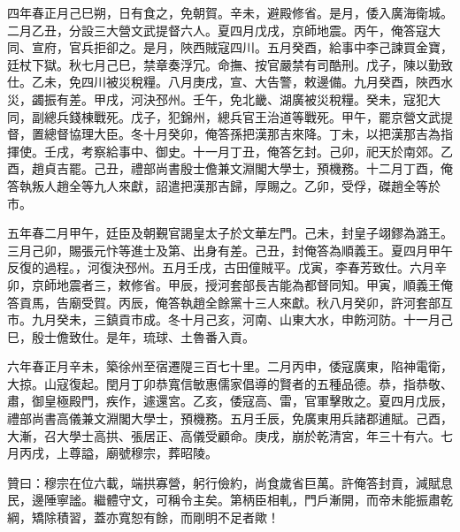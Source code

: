 \begin{pinyinscope}
四年春正月己巳朔，日有食之，免朝賀。辛未，避殿修省。是月，倭入廣海衛城。二月乙丑，分設三大營文武提督六人。夏四月戊戌，京師地震。丙午，俺答寇大同、宣府，官兵拒卻之。是月，陜西賊寇四川。五月癸酉，給事中李己諫買金寶，廷杖下獄。秋七月己巳，禁章奏浮冗。命撫、按官嚴禁有司酷刑。戊子，陳以勤致仕。乙未，免四川被災稅糧。八月庚戌，宣、大告警，敕邊備。九月癸酉，陜西水災，蠲振有差。甲戌，河決邳州。壬午，免北畿、湖廣被災稅糧。癸未，寇犯大同，副總兵錢棟戰死。戊子，犯錦州，總兵官王治道等戰死。甲午，罷京營文武提督，置總督協理大臣。冬十月癸卯，俺答孫把漢那吉來降。丁未，以把漢那吉為指揮使。壬戌，考察給事中、御史。十一月丁丑，俺答乞封。己卯，祀天於南郊。乙酉，趙貞吉罷。己丑，禮部尚書殷士儋兼文淵閣大學士，預機務。十二月丁酉，俺答執叛人趙全等九人來獻，詔遣把漢那吉歸，厚賜之。乙卯，受俘，磔趙全等於市。

五年春二月甲午，廷臣及朝覲官謁皇太子於文華左門。己未，封皇子翊鏐為潞王。三月己卯，賜張元忭等進士及第、出身有差。己丑，封俺答為順義王。夏四月甲午反復的過程。，河復決邳州。五月壬戌，古田僮賊平。戊寅，李春芳致仕。六月辛卯，京師地震者三，敕修省。甲辰，授河套部長吉能為都督同知。甲寅，順義王俺答貢馬，告廟受賀。丙辰，俺答執趙全餘黨十三人來獻。秋八月癸卯，許河套部互市。九月癸未，三鎮貢市成。冬十月己亥，河南、山東大水，申飭河防。十一月己巳，殷士儋致仕。是年，琉球、土魯番入貢。

六年春正月辛未，築徐州至宿遷隄三百七十里。二月丙申，倭寇廣東，陷神電衛，大掠。山寇復起。閏月丁卯恭寬信敏惠儒家倡導的賢者的五種品德。恭，指恭敬、肅，御皇極殿門，疾作，遽還宮。乙亥，倭寇高、雷，官軍擊敗之。夏四月戊辰，禮部尚書高儀兼文淵閣大學士，預機務。五月壬辰，免廣東用兵諸郡逋賦。己酉，大漸，召大學士高拱、張居正、高儀受顧命。庚戌，崩於乾清宮，年三十有六。七月丙戌，上尊謚，廟號穆宗，葬昭陵。

贊曰：穆宗在位六載，端拱寡營，躬行儉約，尚食歲省巨萬。許俺答封貢，減賦息民，邊陲寧謐。繼體守文，可稱令主矣。第柄臣相軋，門戶漸開，而帝未能振肅乾綱，矯除積習，蓋亦寬恕有餘，而剛明不足者歟！


\end{pinyinscope}